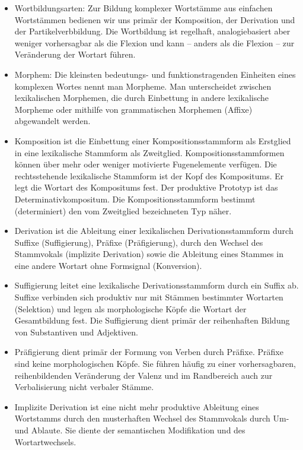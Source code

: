 \begin{itemize}

\item Wortbildungsarten: Zur Bildung komplexer Wortstämme aus einfachen Wortstämmen bedienen wir uns primär der Komposition, der Derivation und der Partikelverbbildung. Die Wortbildung ist regelhaft, analogiebasiert aber weniger vorhersagbar als die Flexion und kann -- anders als die Flexion -- zur Veränderung der Wortart führen.

\item Morphem: Die kleinsten bedeutungs- und funktionstragenden Einheiten eines komplexen Wortes nennt man Morpheme. Man unterscheidet zwischen lexikalischen Morphemen, die durch Einbettung in andere lexikalische Morpheme oder mithilfe von grammatischen Morphemen (Affixe) abgewandelt werden.

\item Komposition ist die Einbettung einer Kompositionsstammform als Erstglied in eine lexikalische Stammform als Zweitglied. Kompositionsstammformen können über mehr oder weniger motivierte Fugenelemente verfügen. Die rechtsstehende lexikalische Stammform ist der Kopf des Kompositums. Er legt die Wortart des Kompositums fest. Der produktive Prototyp ist das Determinativkompositum. Die Kompositionsstammform bestimmt (determiniert) den vom Zweitglied bezeichneten Typ näher.

\item Derivation ist die Ableitung einer lexikalischen Derivationsstammform durch Suffixe (Suffigierung), Präfixe (Präfigierung), durch den Wechsel des Stammvokals (implizite Derivation) sowie die Ableitung eines Stammes in eine andere Wortart ohne Formsignal (Konversion).

\item Suffigierung leitet eine lexikalische Derivationsstammform durch ein Suffix ab. Suffixe verbinden sich produktiv nur mit Stämmen bestimmter Wortarten (Selektion) und legen als morphologische Köpfe die Wortart der Gesamtbildung fest. Die Suffigierung dient primär der reihenhaften Bildung von Substantiven und Adjektiven.

\item Präfigierung dient primär der Formung von Verben durch Präfixe. Präfixe sind keine morphologischen Köpfe. Sie führen häufig zu einer vorhersagbaren, reihenbildenden Veränderung der Valenz und im Randbereich auch zur Verbalisierung nicht verbaler Stämme.

\item Implizite Derivation ist eine nicht mehr produktive Ableitung eines Wortstamms durch den musterhaften Wechsel des Stammvokals durch Um- und Ablaute. Sie diente der semantischen Modifikation und des Wortartwechsels.


\end{itemize}
